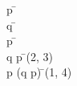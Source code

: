 \documentclass{article}
\begin{document}
\begin{proofbox}
\open
\: p \= \asm \\
\open
\: q \= \asm \\
\: p \=  \\
\close
\: q \rightarrow p \= \impliesintro(2, 3) \\
\close
\: p \rightarrow (q \rightarrow p) \= \impliesintro(1, 4) \\
\end{proofbox}
\end{document}
